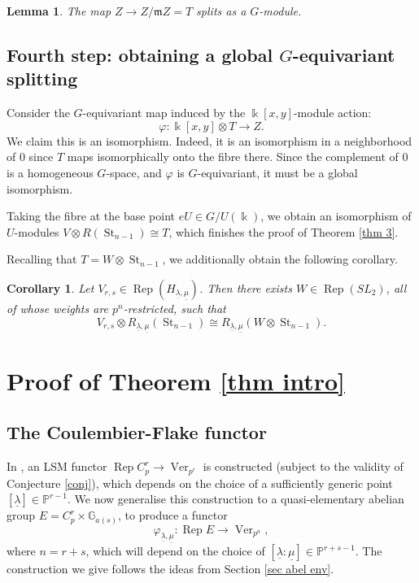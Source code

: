 \documentclass[11pt]{amsart}
\def\G{\mathbb{G}}
\def\m{\mathfrak{m}}
\def\Rep{\operatorname{Rep}}
\def\Ver{\operatorname{Ver}}
\def\ul{\underline}
\newtheorem{cor}[thm]{Corollary}
\newtheorem{lemma}[thm]{Lemma}
\theoremstyle{definition}
\theoremstyle{remark}
\numberwithin{equation}{section}
\begin{document}
\begin{lemma}
    The map $Z\to Z/\m Z=T$ splits as a $G$-module.
\end{lemma}

\subsection{Fourth step: obtaining a global $G$-equivariant splitting}

Consider the $G$-equivariant map induced by the $\Bbbk[x,y]$-module action:
\[
\varphi:\Bbbk[x,y]\otimes T\to Z.
\]
We claim this is an isomorphism.  Indeed, it is an isomorphism in a neighborhood of 0 since $T$ maps isomorphically onto the fibre there.  Since the complement of 0 is a homogeneous $G$-space, and $\varphi$ is $G$-equivariant, it must be a global isomorphism.  

Taking the fibre at the base point $eU\in G/U(\Bbbk)$, we obtain an isomorphism of $U$-modules $V\otimes R(\operatorname{St}_{n-1})\cong T$, which finishes the proof of Theorem \ref{thm 3}.

Recalling that $T=W\otimes \operatorname{St}_{n-1}$, we additionally obtain the following corollary.

\begin{cor}\label{cor 2}
    Let $V_{r,s}\in\Rep(H_{\underline{\lambda},\underline{\mu}})$.  Then there exists $W\in\Rep(SL_2)$, all of whose weights are $p^n$-restricted, such that 
    \[
    V_{r,s}\otimes R_{\underline{\lambda},\underline{\mu}}(\operatorname{St}_{n-1})\cong R_{\underline{\lambda},\underline{\mu}}(W\otimes\operatorname{St}_{n-1}).
    \]
\end{cor}



\section{Proof of Theorem \ref{thm intro}}

\subsection{The Coulembier-Flake functor}

In \cite{CF}, an LSM functor $\Rep C_p^r\to\Ver_{p^r}$ is constructed (subject to the validity of Conjecture \ref{conj}), which depends on the choice of a sufficiently generic point $[\underline{\lambda}]\in\mathbb{P}^{r-1}$.  We now generalise this construction to a quasi-elementary abelian group $E=C_p^r\times\G_{a(s)}$, to produce a functor 
\[
\varphi_{\underline{\lambda},\underline{\mu}}:\Rep E\to\Ver_{p^n},
\]
where $n=r+s$, which will depend on the choice of $[\underline{\lambda}:\ul{\mu}]\in\mathbb{P}^{r+s-1}$.  The construction we give follows the ideas from Section \ref{sec abel env}.
\end{document}
